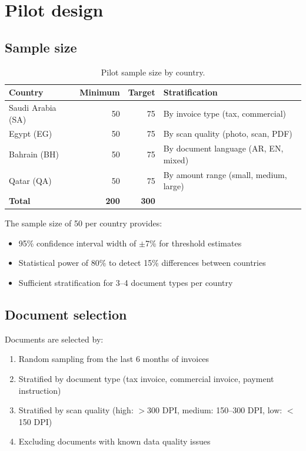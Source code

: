 \documentclass[11pt,a4paper,twoside]{report}
\begin{document}
\section{Pilot design}

\subsection{Sample size}

\begin{table}[htbp]
\centering
\caption{Pilot sample size by country.}
\label{tab:pilot-sample}
\footnotesize
\begin{tabularx}{\linewidth}{@{}l r r X@{}}
\toprule
\textbf{Country} & \textbf{Minimum} & \textbf{Target} & \textbf{Stratification} \\ \midrule
Saudi Arabia (SA) & 50 & 75 & By invoice type (tax, commercial) \\
Egypt (EG) & 50 & 75 & By scan quality (photo, scan, PDF) \\
Bahrain (BH) & 50 & 75 & By document language (AR, EN, mixed) \\
Qatar (QA) & 50 & 75 & By amount range (small, medium, large) \\
\textbf{Total} & \textbf{200} & \textbf{300} & \\
\bottomrule
\end{tabularx}
\end{table}

The sample size of 50 per country provides:
\begin{itemize}
  \item 95\% confidence interval width of $\pm$7\% for threshold estimates
  \item Statistical power of 80\% to detect 15\% differences between countries
  \item Sufficient stratification for 3--4 document types per country
\end{itemize}

\subsection{Document selection}

Documents are selected by:
\begin{enumerate}
  \item Random sampling from the last 6 months of invoices
  \item Stratified by document type (tax invoice, commercial invoice, payment
        instruction)
  \item Stratified by scan quality (high: $>$300 DPI, medium: 150--300 DPI,
        low: $<$150 DPI)
  \item Excluding documents with known data quality issues
\end{enumerate}
\end{document}
